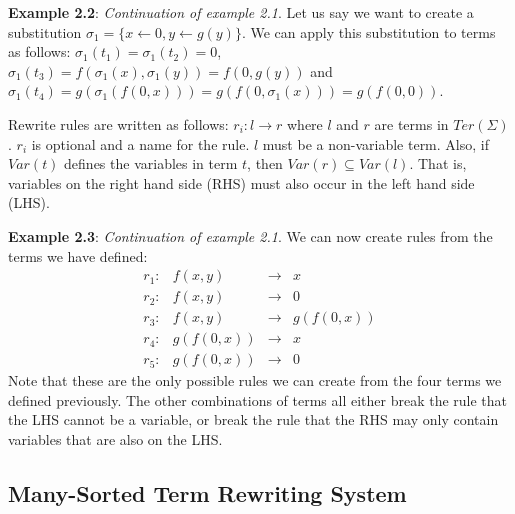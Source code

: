 \textbf{Example 2.2}: \textit{Continuation of example 2.1}. Let us say we want to create a substitution $\sigma_1 = \{ x \leftarrow 0, y \leftarrow g(y) \}$. We can apply this substitution to terms as follows: $\sigma_1(t_1) = \sigma_1(t_2) = 0$, $\sigma_1(t_3) = f(\sigma_1(x), \sigma_1(y)) = f(0, g(y))$ and $\sigma_1(t_4) = g(\sigma_1(f(0, x))) = g(f(0, \sigma_1(x))) = g(f(0, 0))$.\newline

Rewrite rules are written as follows: $r_i : l \rightarrow r$ where $l$ and $r$ are terms in $\textit{Ter}(\Sigma)$. $r_i$ is optional and a name for the rule. $l$ must be a non-variable term. Also, if $\textit{Var}(t)$ defines the variables in term $t$, then $\textit{Var}(r) \subseteq \textit{Var}(l)$. That is, variables on the right hand side (RHS) must also occur in the left hand side (LHS). \newline

\textbf{Example 2.3}: \textit{Continuation of example 2.1}. We can now create rules from the terms we have defined:\newline
$$
\begin{array}{lrcl}
    r_1: & f(x, y) & \rightarrow & x \\
    r_2: & f(x, y) & \rightarrow & 0 \\
    r_3: & f(x, y) & \rightarrow & g(f(0, x))\\
    r_4: & g(f(0, x)) & \rightarrow & x\\
    r_5: & g(f(0, x)) & \rightarrow & 0
\end{array}
$$
Note that these are the only possible rules we can create from the four terms we defined previously. The other combinations of terms all either break the rule that the LHS cannot be a variable, or break the rule that the RHS may only contain variables that are also on the LHS.

\subsection{Many-Sorted Term Rewriting System}
